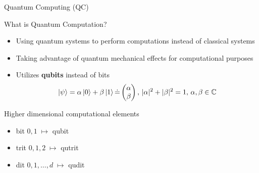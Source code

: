 \documentclass[t]{beamer}
\begin{document}
\begin{frame}{Quantum Computing (QC)}
\begin{block}{What is Quantum Computation?}
\begin{itemize}
\item Using quantum systems to perform computations instead of classical systems
\item Taking advantage of quantum mechanical effects for computational purposes
    
\item Utilizes \textbf{qubits} instead of bits
\begin{equation}
   \ket{\psi} = \alpha\ket{0} + \beta\ket{1} \Dot{=} \begin{pmatrix}
   \alpha\\ \beta 
   \end{pmatrix},\, |\alpha|^2 + |\beta|^2 = 1,\, \alpha,\beta\in\mathbb{C}
\end{equation}

\end{itemize}
\end{block}

\begin{block}{Higher dimensional computational elements}
\begin{itemize}
    \item bit $0,1 \;\mapsto$ qubit 
    \item trit $0,1,2 \;\mapsto$ qutrit   
    \item dit  $0,1,\dots, d \;\mapsto$ qudit
\end{itemize}
\end{block}
    
\end{frame}
\end{document}
